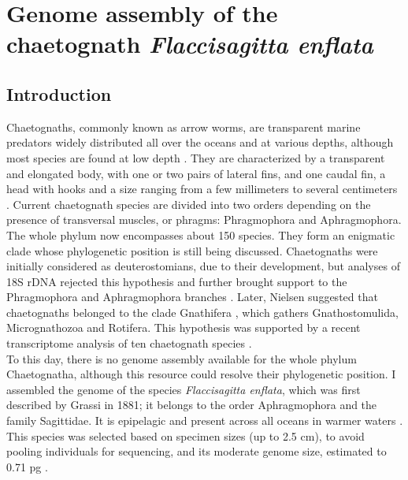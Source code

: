 
\chapter{Genome assembly of the chaetognath \textit{Flaccisagitta enflata}}

\section{Introduction}

Chaetognaths, commonly known as arrow worms, are transparent marine predators widely distributed all over the oceans and at various depths, although most species are found at low depth \cite{alvarino1964bathymetric}. They are characterized by a transparent and elongated body, with one or two pairs of lateral fins, and one caudal fin, a head with hooks and a size ranging from a few millimeters to several centimeters \cite{ghirardelli1969}. Current chaetognath species are divided into two orders depending on the presence of transversal muscles, or phragms: Phragmophora and Aphragmophora. The whole phylum now encompasses about 150 species. They form an enigmatic clade whose phylogenetic position is still being discussed. Chaetognaths were initially considered as deuterostomians, due to their development, but analyses of 18S rDNA rejected this hypothesis \cite{telford1993phylogenetic,wada1994details} and further brought support to the Phragmophora and Aphragmophora branches \cite{telford1997evolution}. Later, Nielsen suggested that chaetognaths belonged to the clade Gnathifera \cite{nielsen2011}, which gathers Gnathostomulida, Micrognathozoa and Rotifera. This hypothesis was supported by a recent transcriptome analysis of ten chaetognath species \cite{marletaz2019new}.  \\

To this day, there is no genome assembly available for the whole phylum Chaetognatha, although this resource could resolve their phylogenetic position. I assembled the genome of the species \textit{Flaccisagitta enflata}, which was first described by Grassi in 1881; it belongs to the order Aphragmophora and the family Sagittidae. It is epipelagic and present across all oceans in warmer waters \cite{michel1984}. This species was selected based on specimen sizes (up to 2.5 cm), to avoid pooling individuals for sequencing, and its moderate genome size, estimated to 0.71 pg \cite{animal_genome_size}. \\

